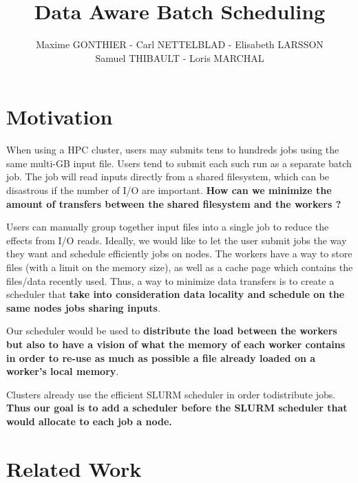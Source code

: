 \documentclass[a4paper]{article}
\title{Data Aware Batch Scheduling}
\author{Maxime GONTHIER - Carl NETTELBLAD - Elisabeth LARSSON \\ Samuel THIBAULT - Loris MARCHAL}
\begin{document}
\maketitle
\tableofcontents
\listoffigures
\newpage


\section{Motivation}

When using a HPC cluster, users may submits tens to hundreds jobs using the same multi-GB input file.
Users tend to submit each such run as a separate batch job.
The job will read inputs directly from a shared filesystem, which can be disastrous if the number of I/O are important.
\textbf{How can we minimize the amount of transfers between the shared filesystem and the workers ?}

Users can manually group together input files into a single job to reduce the effects from I/O reads.
Ideally, we would like to let the user submit jobs the way they want and schedule efficiently jobs on nodes.
The workers have a way to store files (with a limit on the memory size), as well as a cache page which contains the files/data recently used.
Thus, a way to minimize data transfers is to create a scheduler that \textbf{take into consideration data locality and schedule on the same nodes jobs sharing inputs}.

Our scheduler would be used to \textbf{distribute the load between the workers but also to have a vision of what the memory of each worker contains in order to re-use as much as possible a file already loaded on a worker's local memory}.

Clusters already use the efficient SLURM scheduler in order todistribute jobs.
\textbf{Thus our goal is to add a scheduler before the SLURM scheduler that would allocate to each job a node.}

\section{Related Work}
\end{document}
